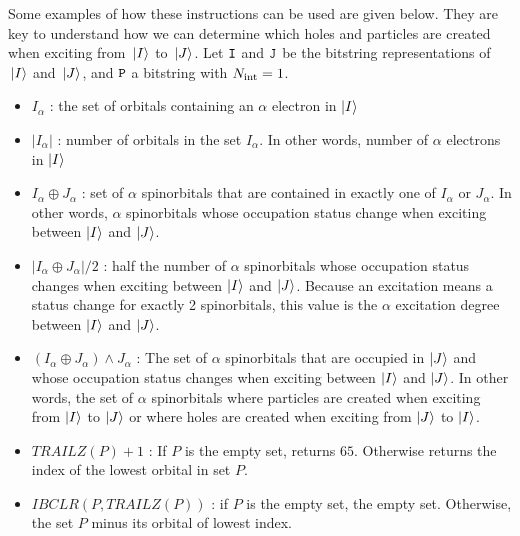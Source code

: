 \documentclass[./thesis.tex]{subfiles}
\begin{document}
       
Some examples of how these instructions can be used are given below. They are key to understand how we can determine which holes and particles are created when exciting from ${\ket*{I}}$ to ${\ket*{J}}$.
Let ${\texttt{I}}$ and ${{\texttt{J}}}$ be the bitstring representations of ${\ket*{I}}$ and ${\ket*{J}}$, and ${\texttt{P}}$ a bitstring with ${N_\text{int}}=1$. 


      
      
\begin{itemize}
	      
	\item
		$I_{\alpha}$ : the set of orbitals containing an $\alpha$ electron in $\ket I$
	            
	\item
		$|I_{\alpha}|$ : number of orbitals in the set $I_{\alpha}$. In other words, number of $\alpha$ electrons in $\ket I$ 
	            
	\item
		$I_{\alpha} \oplus J_{\alpha}$ : set of $\alpha$ spinorbitals that are contained in exactly one of $I_{\alpha}$ or $J_{\alpha}$. In other words, $\alpha$ spinorbitals whose occupation status change when exciting between $\ket I$ and $\ket J$. 
	            
	\item
		$|I_{\alpha} \oplus J_{\alpha}|/2$ : half the number of $\alpha$ spinorbitals whose occupation status changes when exciting between $\ket I$ and $\ket J$. Because an excitation means a status change for exactly 2 spinorbitals, this value is the $\alpha$ excitation degree between $\ket I$ and $\ket J$.
	            
	\item
		$(I_{\alpha} \oplus J_{\alpha}) \wedge J_{\alpha}$ :
	      The set of $\alpha$ spinorbitals that are occupied in $\ket J$ and whose occupation status changes when exciting between $\ket I$ and $\ket J$. In other words, the set of $\alpha$ spinorbitals where particles are created when exciting from $\ket I$ to $\ket J$ or where holes are created when exciting from $\ket J$ to $\ket I$.
	            
	\item
		$TRAILZ(P)+1$ :
	      If $P$ is the empty set, returns $65$. Otherwise returns the index of the lowest orbital in set $P$.
	            
	\item
		$IBCLR(P,TRAILZ(P))$ :
	      if $P$ is the empty set, the empty set. Otherwise, the set $P$ minus its orbital of lowest index.
\end{itemize}
\end{document}
